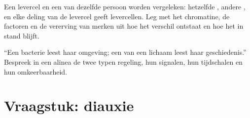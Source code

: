 \begin{exercise}[$\star\star\star$]\label{exo:b1:expression-control:11}
Een levercel en een  van dezelfde persoon worden vergeleken: hetzelfde
, andere , en elke deling van de levercel geeft levercellen. Leg met
het chromatine, de factoren en de vererving van merken uit hoe het verschil ontstaat
en hoe het in stand blijft.
\end{exercise}

\begin{exercise}[$\star\star\star$]\label{exo:b1:expression-control:12}
``Een bacterie leest haar omgeving; een  van een lichaam leest haar
geschiedenis.'' Bespreek in een alinea de twee typen regeling, hun signalen, hun
tijdschalen en hun omkeerbaarheid.
\end{exercise}

\section{Vraagstuk: diauxie}

